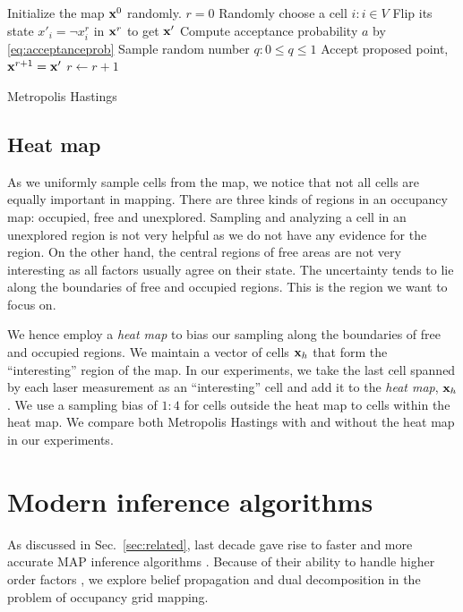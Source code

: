 \documentclass[letterpaper, 10 pt, conference]{ieeeconf} %
\begin{document}
% 
\begin{algorithm}
  Initialize the map $\mathbf{x}^0$ randomly.\;
  $r = 0$\;
   {
    Randomly choose a cell $i : i \in V$\;
    Flip its state $x'_i = \neg x^r_i$ in $\mathbf{x}^r$ to get $\mathbf{x}'$\;
    Compute acceptance probability $a$ by \eqref{eq:acceptanceprob}\;
    Sample random number $q : 0 \le q \le 1$\;
     {
      Accept proposed point, $\mathbf{x}^{r + 1} = \mathbf{x}'$\;
    } 
    $r \leftarrow r + 1$\;
  }
  \caption{Metropolis Hastings}
  \label{alg:metropolis}
\end{algorithm}

\subsection{Heat map}
As we uniformly sample cells from the map, we notice that not all
cells are equally important in mapping. There are three kinds of regions in an 
occupancy map: occupied, free and unexplored. Sampling and analyzing a cell in 
an
unexplored region is not very helpful as we do not have any evidence for the
region. On the other hand, the central regions of free areas are not very
interesting as all factors usually agree on their state. The uncertainty tends 
to lie
along the boundaries of free and occupied regions. This is the
region we want to focus on.

We hence employ a \emph{heat map} to bias our sampling along the boundaries of free
and occupied regions. We maintain a vector of cells $\mathbf{x}_h$ that form the
``interesting'' region of the map. In our experiments, we take the last cell
spanned by each laser measurement as an ``interesting'' cell and add it to the
\emph{heat map}, $\mathbf{x}_h$. We use a sampling bias of $1:4$ for cells
outside the heat map to cells within the heat map. We compare both Metropolis Hastings
with and without the heat map in our experiments.

\section{Modern inference algorithms}
As discussed in Sec.~\ref{sec:related}, last decade gave rise to faster and
more accurate MAP inference algorithms \cite{kappes2013comparative}. Because of
their ability to handle higher order factors
\cite{potetz2007efficient,komodakis2009beyond}, we explore belief propagation
and dual decomposition in the problem of occupancy grid mapping.
\end{document}

